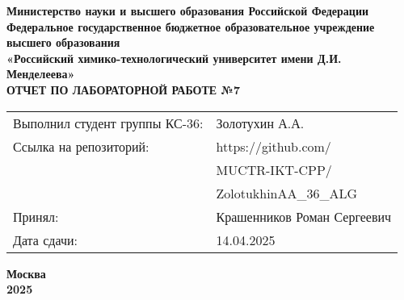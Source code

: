 \documentclass[12pt, a4paper]{report}
\begin{document}
	\begin{titlepage}
		\begin{center}
			\large \textbf{Министерство науки и высшего образования Российской Федерации} \\
			\large \textbf{Федеральное государственное бюджетное образовательное учреждение высшего образования} \\
			\large \textbf{«Российский химико-технологический университет имени Д.И. Менделеева»} \\

			\vspace*{4cm}
			\LARGE \textbf{ОТЧЕТ ПО ЛАБОРАТОРНОЙ РАБОТЕ №7}

			\vspace*{4cm}
			\begin{flushright}
				\Large
				\begin{tabular}{>{\raggedleft\arraybackslash}p{9cm} p{10cm}}
					Выполнил студент группы КС-36: & Золотухин А.А. \\
					Ссылка на репозиторий: & https://github.com/ \\
					& MUCTR-IKT-CPP/ \\
					& ZolotukhinAA\_36\_ALG \\
					Принял: & Крашенников Роман Сергеевич \\
					Дата сдачи: & 14.04.2025 \\
				\end{tabular}
			\end{flushright}

			\vspace*{6cm}
			\Large \textbf{Москва \\ 2025}
		\end{center}
	\end{titlepage}

	\tableofcontents
	\thispagestyle{empty}
	\newpage

\end{document}
